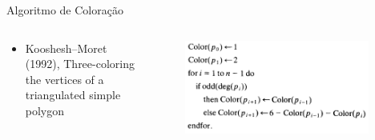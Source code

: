 \documentclass[aspectratio=169,usenames,dvipsnames]{beamer}
\begin{document}
\begin{frame}{Algoritmo de Coloração}
  \begin{columns}
    \begin{center}
      \begin{itemize}
        \item Kooshesh–Moret (1992), Three-coloring the vertices of a triangulated simple polygon
      \end{itemize}
    \end{center}
    \begin{center}
      \begin{figure}
        \includegraphics[width=0.95\textwidth]{figures/coloracao.png}
      \end{figure}
    \end{center}
  \end{columns}
\end{frame}
\end{document}
